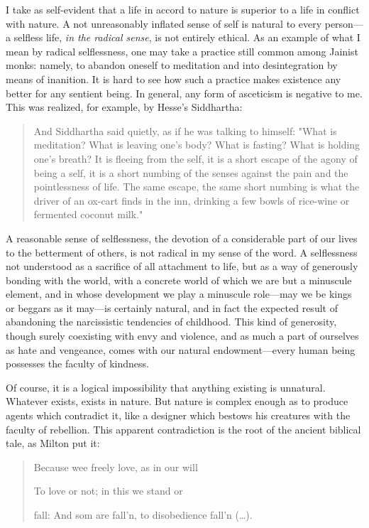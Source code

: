 \documentclass[a4paper, 12pt]{article}
\begin{document}
I take as self-evident that a life in accord to nature is superior to a life in
conflict with nature. A not unreasonably inflated sense of self is natural to
every person---a selfless life, \textit{in the radical sense}, is not entirely
ethical. As an example of what I mean by radical selflessness, one may take
a practice still common among Jainist monks: namely, to abandon oneself
to meditation and into desintegration by means of inanition. It is hard to see
how such a practice makes existence any better for any sentient being. In
general, any form of asceticism is negative to me. This was realized, for
example, by Hesse's Siddhartha:

\begin{quote} And Siddhartha said quietly, as if he was talking to himself:
    "What is meditation? What is leaving one's body? What is fasting? What is
    holding one's breath? It is fleeing from the self, it is a short escape of
    the agony of being a self, it is a short numbing of the senses against the
    pain and the pointlessness of life. The same escape, the same short numbing
is what the driver of an ox-cart finds in the inn, drinking a few bowls of
rice-wine or fermented coconut milk." \end{quote}

A reasonable sense of selflessness, the devotion of a considerable part of our
lives to the betterment of others, is not radical in my sense of the word. A
selflessness not understood as a sacrifice of all attachment to life, but as a
way of generously bonding with the world, with a concrete world of which we
are but a minuscule element, and in whose development we play a minuscule role---may we
be kings or beggars as it may---is certainly natural, and in fact the expected
result of abandoning the narcissistic tendencies of childhood. This kind of
generosity, though surely coexisting with envy and violence, and as much a part
of ourselves as hate and vengeance, comes with our natural endowment---every human 
being possesses the faculty of kindness. 

Of course, it is a logical impossibility that anything existing is unnatural.
Whatever exists, exists in nature. But nature is complex enough as to produce
agents which contradict it, like a designer which bestows his creatures with
the faculty of rebellion. This apparent contradiction is the root of the
ancient biblical tale, as Milton put it:

\begin{quote}
    Because wee freely love, as in our will 

    To love or not; in this we stand or
    
    fall: And som are fall’n, to disobedience fall’n (\ldots).
\end{quote}
\end{document}
